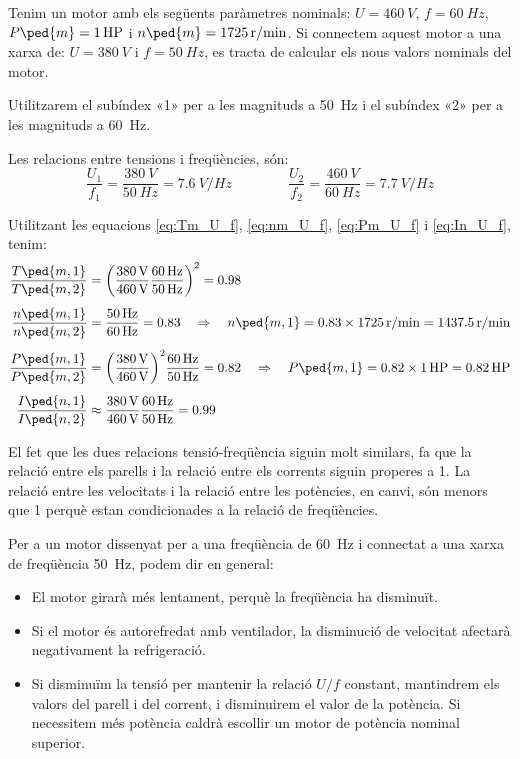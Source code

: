 \begin{exemple}[\MotorVarParamTensFreq{}]
	\addcontentsxms{\MotorVarParamTensFreq}
	Tenim un motor amb els següents paràmetres nominals: $U=\qty{460}{V}$, $f=\qty{60}{Hz}$,  $P\ped{m}=\qty{1}{HP}$ i $n\ped{m}=\qty{1725}{r/min}$. Si connectem aquest motor a una xarxa de: $U=\qty{380}{V}$ i $f=\qty{50}{Hz}$, es tracta de calcular els nous valors nominals del motor.
	
	Utilitzarem el subíndex «1» per a les magnituds  a \qty{50}{Hz} i el  subíndex «2» per a les magnituds a \qty{60}{Hz}.
	
	Les relacions entre tensions i freqüències,  són:
	\[
		\frac{U_1}{f_1} = \frac{\qty{380}{V}}{\qty{50}{Hz}} = \qty{7,6}{V/Hz} \qquad \qquad
		\frac{U_2}{f_2} = \frac{\qty{460}{V}}{\qty{60}{Hz}} = \qty{7,7}{V/Hz} 
	\]

	Utilitzant les equacions \eqref{eq:Tm_U_f},  \eqref{eq:nm_U_f}, \eqref{eq:Pm_U_f} i \eqref{eq:In_U_f},  tenim:
	\begin{align*}
		\frac{T\ped{m,1}}{T\ped{m,2}} &= {\left(\frac{\qty{380}{V}}{\qty{460}{V}}\frac{\qty{60}{Hz}}{\qty{50}{Hz}}\right)}^2 = \num{0,98} \\[1ex]
		\frac{n\ped{m,1}}{n\ped{m,2}} &= \frac{\qty{50}{Hz}}{\qty{60}{Hz}} = \num{0,83}  \quad \Rightarrow \quad n\ped{m,1} = \num{0,83} \times \qty{1725}{r/min} = \qty{1437,5}{r/min} \\[1ex]
		\frac{P\ped{m,1}}{P\ped{m,2}} &= {\left(\frac{\qty{380}{V}}{\qty{460}{V}}\right)}^{2} \frac{\qty{60}{Hz}}{\qty{50}{Hz}} = \num{0,82} \quad \Rightarrow \quad P\ped{m,1} = \num{0,82} \times \qty{1}{HP} = \qty{0,82}{HP}\\[1ex]
		\frac{I\ped{n,1}}{I\ped{n,2}} &\approx
		\frac{\qty{380}{V}}{\qty{460}{V}} \frac{\qty{60}{Hz}}{\qty{50}{Hz}} = \num{0,99}
	\end{align*}

	El fet que les dues relacions tensió-freqüència siguin molt similars, fa que la relació entre els parells i la relació entre els corrents siguin properes a 1. La relació entre les velocitats i la relació entre les potències, en canvi, són menors que 1 perquè estan condicionades a la relació de freqüències. 
\end{exemple}


Per a un motor dissenyat per a una freqüència de \qty{60}{Hz} i connectat a una xarxa de freqüència \qty{50}{Hz}, podem dir en general:
\begin{itemize}
	\item El motor girarà més lentament, perquè la freqüència ha disminuït.
	\item Si el motor és autorefredat amb ventilador, la disminució de velocitat afectarà negativament  la refrigeració.
	\item Si disminuïm la tensió  per mantenir la relació $U/f$ constant, mantindrem els valors del parell i del corrent, i disminuirem el valor de la potència. Si necessitem més potència caldrà escollir un motor de potència nominal superior.
\end{itemize}

